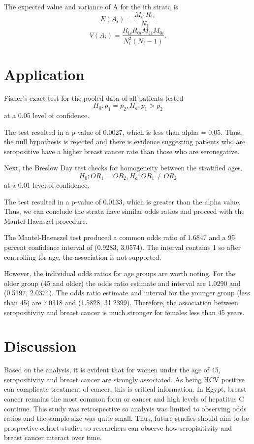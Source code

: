 \documentclass[12pt, titlepage]{article}
\begin{document}
\vspace{1cm}

The expected value and variance of A for the ith strata is 
\[
  E(A_{i})=\frac{M_{i1}R_{1i}}{N_{i}} 
\]
\[
  V(A_{i})=\frac{R_{1i}R_{0i}M_{1i}M_{0i}}{N_i^2(N_{i}-1)}. 
\]


\section{Application}
\label{sec:app}
Fisher's exact test for the pooled data of all patients tested 
\[
H_{0}:p_{1}=p_{2}, H_{a}:p_{1}>p_{2}
\]
at a 0.05 level of confidence.

The test resulted in a p-value of 0.0027, which is less than 
alpha = 0.05. Thus, the null hypothesis is rejected and there 
is evidence suggesting patients who are seropositive have a
higher breast cancer rate than those who are seronegative.

Next, the Breslow Day test checks for homogeneity between the 
stratified ages. 
\[
H_{0}:OR_{1}=OR_{2}, H_{a}:OR_{1}\neq{OR_{2}}
\]
at a 0.01 level of confidence. 

The test resulted in a p-value of 0.0133, which is greater than
the alpha value. Thus, we can conclude the strata have similar
odds ratios and proceed with the Mantel-Haenszel procedure. 

The Mantel-Haenszel test produced a common odds ratio of 1.6847 and 
a 95 percent confidence interval of (0.9283, 3.0574). The interval
contains 1 so after controlling for age, the association is not supported.

However, the individual odds ratios for age groups are worth noting. For 
the older group (45 and older) the odds ratio estimate and interval are 
1.0290 and (0.5197, 2.0374). The odds ratio estimate and interval for the 
younger group (less than 45) are 7.0318 and (1.5828, 31.2399). Therefore,
the association between seropositivity and breast cancer is much stronger
for females less than 45 years. 

\section{Discussion}
\label{sec:discuss}
  Based on the analysis, it is evident that for women under the age of 45,
seropositivity and breast cancer are strongly associated. As being HCV 
positive can complicate treatment of cancer, this is critical information.
In Egypt, breast cancer remains the most common form or cancer and high 
levels of hepatitus C continue. This study was retrospective so analysis 
was limited to observing odds ratios and the sample size was quite small.
Thus, future studies should aim to be prospective cohort studies so 
researchers can observe how seropisitivity and breast cancer interact 
over time. 
\end{document}

